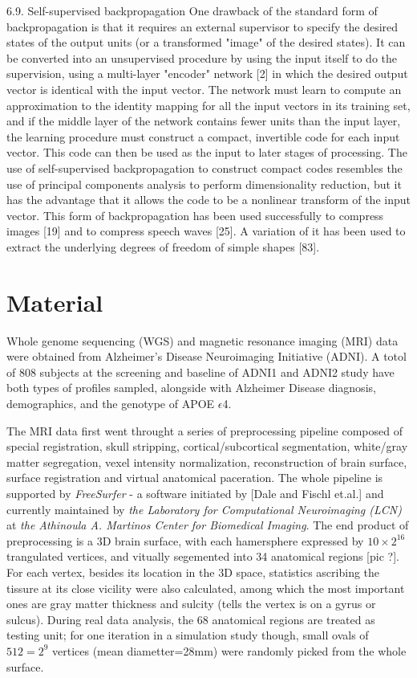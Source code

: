 \documentclass[twocolumn]{article}
\begin{document}
6.9. Self-supervised backpropagation
One drawback of the standard form of backpropagation is that it requires an external supervisor to specify the desired states of the output units (or a transformed "image" of the desired states). It can be converted into an unsupervised procedure by using the input itself to do the supervision, using a multi-layer "encoder" network [2] in which the desired output vector is identical with the input vector. The network must learn to compute an approximation to the identity mapping for all the input vectors in its training set, and if the middle layer of the network contains fewer units than the input
layer, the learning procedure must construct a compact, invertible code for each input vector. This code can then be used as the input to later stages of processing.
The use of self-supervised backpropagation to construct compact codes resembles the use of principal components analysis to perform dimensionality reduction, but it has the advantage that it allows the code to be a nonlinear transform of the input vector. This form of backpropagation has been used successfully to compress images [19] and to compress speech waves [25]. A variation of it has been used to extract the underlying degrees of freedom of simple shapes [83].

\section{Material}
Whole genome sequencing (WGS) and magnetic resonance imaging (MRI) data were obtained from Alzheimer’s Disease Neuroimaging Initiative (ADNI). A totol of 808 subjects at the screening and baseline of ADNI1 and ADNI2 study have both types of profiles sampled, alongside with Alzheimer Disease diagnosis, demographics, and the genotype of APOE $\epsilon$4.

The MRI data first went throught a series of preprocessing pipeline composed of special registration, skull stripping, cortical/subcortical segmentation, white/gray matter segregation, vexel intensity normalization, reconstruction of brain surface, surface registration and virtual anatomical paceration. The whole pipeline is supported by \emph{FreeSurfer} - a software initiated by [Dale and Fischl et.al.] and currently maintained by \textit{the Laboratory for Computational Neuroimaging (LCN)}  at \textit {the Athinoula A. Martinos Center for Biomedical Imaging}. The end product of preprocessing is a 3D brain surface, with each hamersphere expressed by $10\times2^16$ trangulated vertices, and vitually segemented into 34 anatomical regions [pic ?]. For each vertex, besides its location in the 3D space, statistics ascribing the tissure at its close vicility were also calculated, among which the most important ones are gray matter thickness and sulcity (tells the vertex is on a gyrus or sulcus). During real data analysis, the 68 anatomical regions are treated as testing unit; for one iteration in a simulation study though, small ovals of $512=2^9$ vertices (mean diametter=28mm) were randomly picked from the whole surface.
\end{document}
